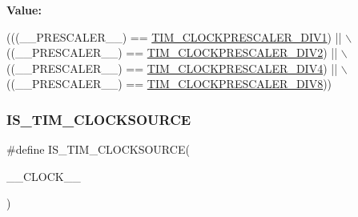 {\bfseries Value\+:}
\begin{DoxyCode}
(((\_\_PRESCALER\_\_) == \hyperlink{group___t_i_m___clock___prescaler_ga3462b444a059f001c6df33f55c756313}{TIM\_CLOCKPRESCALER\_DIV1}) || \(\backslash\)
                                              ((\_\_PRESCALER\_\_) == 
      \hyperlink{group___t_i_m___clock___prescaler_gac6457751c882644727982fda1fd029a5}{TIM\_CLOCKPRESCALER\_DIV2}) || \(\backslash\)
                                              ((\_\_PRESCALER\_\_) == 
      \hyperlink{group___t_i_m___clock___prescaler_ga11ce3686a0ee934384d0e4651823883d}{TIM\_CLOCKPRESCALER\_DIV4}) || \(\backslash\)
                                              ((\_\_PRESCALER\_\_) == 
      \hyperlink{group___t_i_m___clock___prescaler_ga86f147be5654631b21aa391a001401d5}{TIM\_CLOCKPRESCALER\_DIV8}))
\end{DoxyCode}
\mbox{\label{group___t_i_m___private___macros_gaebd00b3c8dd1c689e9d04850333ba719}} 
\subsubsection{\texorpdfstring{I\+S\+\_\+\+T\+I\+M\+\_\+\+C\+L\+O\+C\+K\+S\+O\+U\+R\+CE}{IS\_TIM\_CLOCKSOURCE}}
{\footnotesize\ttfamily \#define I\+S\+\_\+\+T\+I\+M\+\_\+\+C\+L\+O\+C\+K\+S\+O\+U\+R\+CE(\begin{DoxyParamCaption}\item[{}]{\+\_\+\+\_\+\+C\+L\+O\+C\+K\+\_\+\+\_\+ }\end{DoxyParamCaption})}

